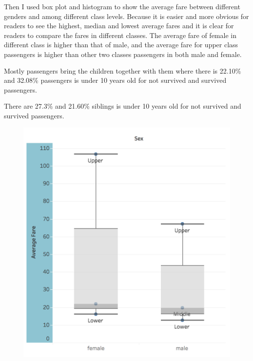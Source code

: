 \documentclass[10pt, a4paper, twocolumn]{article} %
\begin{document}
	
Then I used box plot and histogram to show the average fare between different genders and among different class levels. Because it is easier and more obvious for readers to see the highest, median and lowest average fares and it is clear for readers to compare the fares in different classes. The average fare of female in different class is higher than that of male, and the average fare for upper class passengers is higher than other two classes passengers in both male and female.

Mostly passengers bring the children together with them where there is 22.10\% and 32.08\% passengers is under 10 years old for not survived and survived passengers.

There are 27.3\% and 21.60\% siblings is under 10 years old for not survived and survived passengers.
\begin{figure}[h]
\includegraphics[width=\linewidth]{3-1.png} %
\end{figure}



\end{document}
